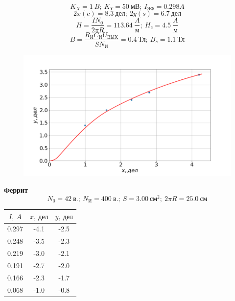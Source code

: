 \documentclass[a4paper, fontsize=14pt]{article}
\begin{document}
\[
	K_X = 1\ B;\ K_Y = 50\ \text{мВ};\ I_\text{ЭФ} = 0.298 A
\]
\[
	2x(c) = 8.3\ \text{дел};\ 2y(s) = 6.7\ \text{дел}
\]
\[
	H = \frac{I N_0}{2 \pi R} = 113.64\ \frac{A}{\text{м}};\ H_c = 4.5\ \frac{A}{\text{м}}
\]
\[
B = \frac{R_\text{И} C_\text{И} U_\text{ВЫХ}}{S N_\text{И}} = 0.4\ \text{Тл};\ B_s = 1.1\ \text{Тл}
\]
\begin{figure}[H]
\center
\includegraphics[scale=0.4]{22.png}

\end{figure}


\textbf{Феррит}
\[
	N_0 = 42\ \text{в.};\ N_\text{И} = 400\ \text{в.};\ S = 3.00\ \text{см}^2;\ 2 \pi R = 25.0\ \text{см}
\]
\begin{table}[H]
	\centering
	\begin{tabular}{|c|c|c|} \hline
		$I,\ A$ &  $x,\ \text{дел}$ & $y,\ \text{дел}$ \\\hline
		0.297 & -4.1 & -2.5 \\\hline
		0.248 & -3.5 & -2.3 \\\hline
		0.219 & -3.0 & -2.1 \\\hline
		0.191 & -2.7 & -2.0 \\\hline
		0.166 & -2.3 & -1.7 \\\hline
		0.068 & -1.0 & -0.8 \\\hline
	\end{tabular}	
\end{table}
\end{document}
